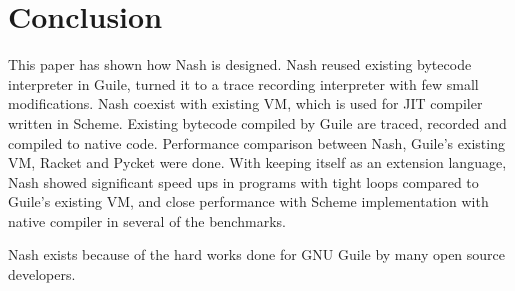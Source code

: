 \documentclass[preprint, 10pt]{sigplanconf}
\begin{document}
\section{Conclusion}
\label{sec:conclusion}
This paper has shown how Nash is designed. Nash reused existing bytecode
interpreter in Guile, turned it to a trace recording interpreter with few small
modifications. Nash coexist with existing VM, which is used for JIT compiler
written in Scheme. Existing bytecode compiled by Guile are traced, recorded and
compiled to native code. Performance comparison between Nash, Guile's existing
VM, Racket and Pycket were done. With keeping itself as an extension language,
Nash showed significant speed ups in programs with tight loops compared to
Guile's existing VM, and close performance with Scheme implementation with
native compiler in several of the benchmarks.


\acks{} Nash exists because of the hard works done for GNU Guile by many open
source developers.







\end{document}
